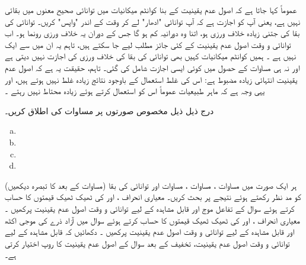 عموماً کہا جاتا ہے کہ اصول عدم یقینیت کے بنا کوانٹم میکانیات میں توانائی صحیح معنوں میں بقائی نہیں ہے، یعنی آپ کو اجازت ہے کہ آپ توانائی  "ادھار" لے کر وقت  کے اندر "واپس" کریں۔ توانائی کی بقا کی جتنی زیادہ خلاف ورزی ہو، اتنا وہ دورانیہ کم ہو گا جس کے دوران یہ خلاف ورزی رونما ہو۔ اب توانائی و وقت اصول عدم یقینیت کے کئی جائز مطلب لیے جا سکتے ہیں، تاہم یہ ان میں سے ایک نہیں ہے ۔ ہمیں کوانٹم میکانیات کہیں بھی توانائی کی بقا کی خلاف ورزی کی اجازت نہیں دیتی ہے اور نہ ہی
 مساوات  کے حصول میں کوئی ایسی اجازت شامل کی گئی۔ تاہم، حقیقت یہ ہے کہ اصول عدم یقینیت انتہائی زیادہ مضبوط ہے: اس کی غلط استعمال کے باوجود نتائج زیادہ غلط نہیں ہوتے ہیں، اور یہی وجہ ہے کہ ماہر طبیعیات عموماً اس کو استعمال کرتے ہوئے زیادہ محتاط نہیں رہتے ۔
 
درج ذیل ذیل مخصوص صورتوں پر مساوات  کی اطلاق کریں۔
\begin{multicols}{4}
\begin{enumerate}[a.]
\item {}
\item {}
\item {}
\item {}
\end{enumerate}
\end{multicols}
 ہر ایک صورت میں مساوات ، مساوات ، مساوات  اور توانائی کی بقا (مساوات  کے بعد کا تبصرہ دیکھیں) کو مد نظر رکھتے ہوئے نتیجے پر بحث کریں۔
معیاری انحراف ،  اور  کی ٹھیک ٹھیک قیمتوں کا حساب کرتے ہوئے سوال  کے تفاعل موج اور قابل مشاہدہ  کے لیے توانائی و وقت اصول عدم یقینیت پرکھیں ۔
معیاری انحراف ،  اور  کی ٹھیک ٹھیک قیمتوں کا حساب کرتے ہوئے سوال  میں آزاد ذرے کی موجی اکٹھ اور قابل مشاہدہ  کے لیے توانائی و وقت اصول عدم یقینیت پرکھیں ۔
دکھائیں کہ قابل مشاہدہ  کے لیے توانائی و وقت اصول عدم یقینیت، تخفیف کے بعد سوال  کے اصول عدم یقینیت کا روپ اختیار کرتی ہے۔

